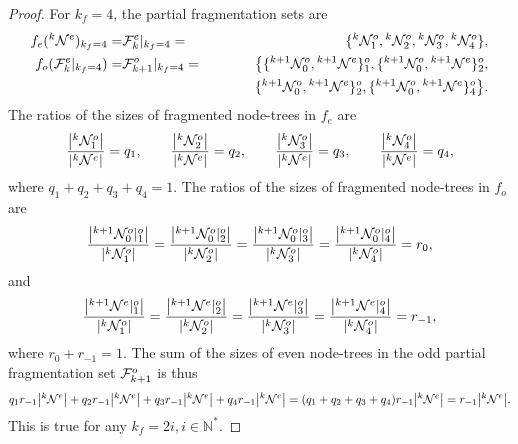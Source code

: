 \begin{proof}
  For $k_f = 4$, the partial fragmentation sets are
  \begin{eqnarray*}
    f_e({}^{k}\mathcal{N}^e)_{k_f = 4} 
    =& \mathcal{F}^e_{k}|_{k_f = 4} 
    =&\{ {}^{k}\mathcal{N}^{o}_1, {}^{k}\mathcal{N}^{o}_2,  {}^{k}\mathcal{N}^{o}_3, {}^{k}\mathcal{N}^{o}_4\},  \\
    f_o(\mathcal{F}^e_{k}|_{k_f = 4}) 
    =& \mathcal{F}^o_{k+1} |_{k_f = 4} 
    =& \big\{      \{ {}^{k+1}\mathcal{N}^{o}_0, {}^{k+1}\mathcal{N}^e\}^o_1, 
                    \{ {}^{k+1}\mathcal{N}^{o}_0, {}^{k+1}\mathcal{N}^e\}^o_2, \\
    && \hspace{3em} \{ {}^{k+1}\mathcal{N}^{o}_0, {}^{k+1}\mathcal{N}^e\}^o_2,
                    \{ {}^{k+1}\mathcal{N}^{o}_0, {}^{k+1}\mathcal{N}^e\}^o_4 \big\}.
  \end{eqnarray*}
  The ratios of the sizes of fragmented node-trees in $f_e$ are
  \begin{equation*}
    \frac{\abs{{}^{k} \mathcal{N}^{o}_1}}{\abs{{}^{k}\mathcal{N}^e}} = q_1, \hspace{2em}
    \frac{\abs{{}^{k} \mathcal{N}^{o}_2}}{\abs{{}^{k}\mathcal{N}^e}} = q_2, \hspace{2em}
    \frac{\abs{{}^{k} \mathcal{N}^{o}_3}}{\abs{{}^{k}\mathcal{N}^e}} = q_3, \hspace{2em}
    \frac{\abs{{}^{k} \mathcal{N}^{o}_4}}{\abs{{}^{k}\mathcal{N}^e}} = q_4, 
  \end{equation*}
  where $ q_1 + q_2 + q_3 + q_4 = 1$. The ratios of the sizes of fragmented node-trees in $f_o$ are
  \begin{equation*}
    \frac{\abs{{}^{k+1}\mathcal{N}^o_0|^o_1}}{\abs{{}^{k} \mathcal{N}^{o}_1}} = 
    \frac{\abs{{}^{k+1}\mathcal{N}^o_0|^o_2}}{\abs{{}^{k} \mathcal{N}^{o}_2}} = 
    \frac{\abs{{}^{k+1}\mathcal{N}^o_0|^o_3}}{\abs{{}^{k} \mathcal{N}^{o}_3}} = 
    \frac{\abs{{}^{k+1}\mathcal{N}^o_0|^o_4}}{\abs{{}^{k} \mathcal{N}^{o}_4}} = r_0,
  \end{equation*}
  and 
  \begin{equation*}
    \frac{\abs{{}^{k+1}\mathcal{N}^e|^o_1}}{\abs{{}^{k} \mathcal{N}^{o}_1}} = 
    \frac{\abs{{}^{k+1}\mathcal{N}^e|^o_2}}{\abs{{}^{k} \mathcal{N}^{o}_2}} = 
    \frac{\abs{{}^{k+1}\mathcal{N}^e|^o_3}}{\abs{{}^{k} \mathcal{N}^{o}_3}} = 
    \frac{\abs{{}^{k+1}\mathcal{N}^e|^o_4}}{\abs{{}^{k} \mathcal{N}^{o}_4}} = r_{-1},  
  \end{equation*}
  where $r_0 + r_{-1} = 1$. The sum of the sizes of even node-trees in  the odd partial fragmentation set $\mathcal{F}^o_{k+1}$ is thus
  \begin{equation*}
    q_1 r_{-1} \abs{{}^{k}\mathcal{N}^e} + q_2 r_{-1} \abs{{}^{k}\mathcal{N}^e} + q_3 r_{-1} \abs{{}^{k}\mathcal{N}^e} + q_4 r_{-1} \abs{{}^{k}\mathcal{N}^e} = (q_1 + q_2 + q_3 + q_4 ) r_{-1} \abs{{}^{k}\mathcal{N}^e} = r_{-1} \abs{{}^{k}\mathcal{N}^e}. 
  \end{equation*}
  This is true for any $k_f = 2i, i\in \mathbb{N}^*$. 
\end{proof}

